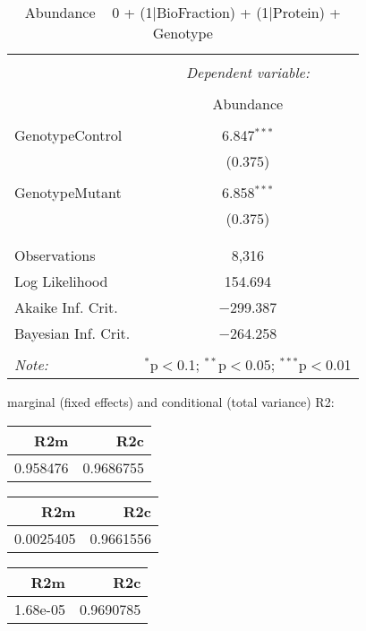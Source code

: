 \documentclass[11pt]{report}
\begin{document}
\begin{table}[!htbp] \centering 
  \caption{Abundance ~ 0 + (1|BioFraction) + (1|Protein) + Genotype} 
  \label{} 
\begin{tabular}{@{\extracolsep{5pt}}lc} 
\\[-1.8ex]\hline 
\hline \\[-1.8ex] 
 & \multicolumn{1}{c}{\textit{Dependent variable:}} \\ 
\cline{2-2} 
\\[-1.8ex] & Abundance \\ 
\hline \\[-1.8ex] 
 GenotypeControl & 6.847$^{***}$ \\ 
  & (0.375) \\ 
  & \\ 
 GenotypeMutant & 6.858$^{***}$ \\ 
  & (0.375) \\ 
  & \\ 
\hline \\[-1.8ex] 
Observations & 8,316 \\ 
Log Likelihood & 154.694 \\ 
Akaike Inf. Crit. & $-$299.387 \\ 
Bayesian Inf. Crit. & $-$264.258 \\ 
\hline 
\hline \\[-1.8ex] 
\textit{Note:}  & \multicolumn{1}{r}{$^{*}$p$<$0.1; $^{**}$p$<$0.05; $^{***}$p$<$0.01} \\ 
\end{tabular} 
\end{table} 
marginal (fixed effects) and conditional (total variance) R2:

\begin{tabular}{r|r}
\hline
R2m & R2c\\
\hline
0.958476 & 0.9686755\\
\hline
\end{tabular}

\begin{tabular}{r|r}
\hline
R2m & R2c\\
\hline
0.0025405 & 0.9661556\\
\hline
\end{tabular}

\begin{tabular}{r|r}
\hline
R2m & R2c\\
\hline
1.68e-05 & 0.9690785\\
\hline
\end{tabular}
\end{document}

